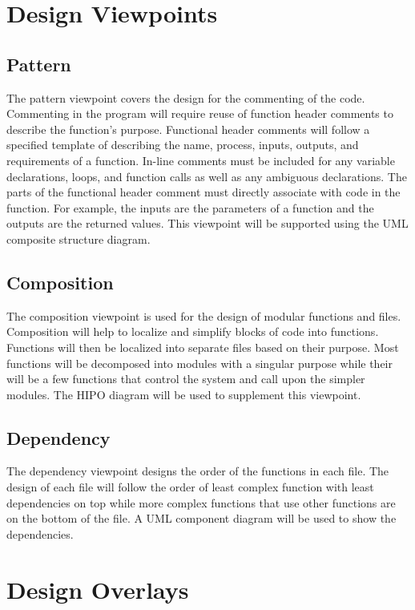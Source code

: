 \documentclass[10pt,letterpaper,onecolumn,draftclsnofoot]{IEEEtran}
\begin{document}
\section{Design Viewpoints}
\subsection{Pattern}
	The pattern viewpoint covers the design for the commenting of the code. Commenting in the program will require reuse of function header comments to describe the function's purpose. Functional header comments will follow a specified template of describing the name, process, inputs, outputs, and requirements of a function. In-line comments must be included for any variable declarations, loops, and function calls as well as any ambiguous declarations. The parts of the functional header comment must directly associate with code in the function. For example, the inputs are the parameters of a function and the outputs are the returned values. This viewpoint will be supported using the UML composite structure diagram.
	
\subsection{Composition}
	The composition viewpoint is used for the design of modular functions and files. Composition will help to localize and simplify blocks of code into functions. Functions will then be localized into separate files based on their purpose. Most functions will be decomposed into modules with a singular purpose while their will be a few functions that control the system and call upon the simpler modules. The HIPO diagram will be used to supplement this viewpoint.

\subsection{Dependency}
	The dependency viewpoint designs the order of the functions in each file. The design of each file will follow the order of least complex function with least dependencies on top while more complex functions that use other functions are on the bottom of the file. A UML component diagram will be used to show the dependencies.


\section{Design Overlays}
\end{document}
